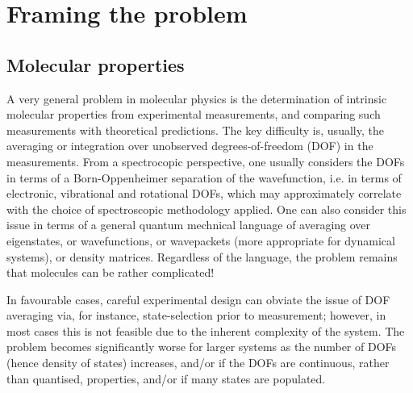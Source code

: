 \section{Framing the problem}

\subsection{Molecular properties}
A very general problem in molecular physics is the determination of intrinsic molecular properties from experimental measurements, and comparing such measurements with theoretical predictions. The key difficulty is, usually, the averaging or integration over unobserved degrees-of-freedom (DOF) in the measurements. From a spectrocopic perspective, one usually considers the DOFs in terms of a Born-Oppenheimer separation of the wavefunction, i.e. in terms of electronic, vibrational and rotational DOFs, which may approximately correlate with the choice of spectroscopic methodology applied. One can also consider this issue in terms of a general quantum mechnical language of averaging over eigenstates, or wavefunctions, or wavepackets (more appropriate for dynamical systems), or density matrices. Regardless of the language, the problem remains that molecules can be rather complicated!

In favourable cases, careful experimental design can obviate the issue of DOF averaging via, for instance, state-selection prior to measurement; however, in most cases this is not feasible due to the inherent complexity of the system. The problem becomes significantly worse for larger systems as the number of DOFs (hence density of states) increases, and/or if the DOFs are continuous, rather than quantised, properties, and/or if many states are populated.